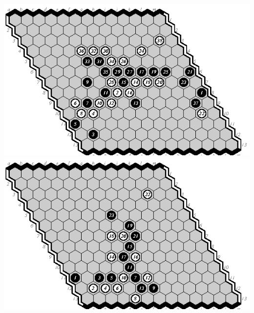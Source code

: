 \documentclass{icga}
\begin{document}
\includegraphics[scale=1.3]{13.07e-m.eps}\hspace*{-2.5cm}\includegraphics[scale=1.3]{13.08d-e.eps}
\end{document}
